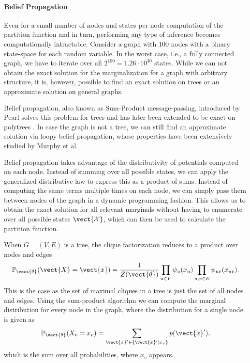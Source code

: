 \paragraph*{Belief Propagation}
Even for a small number of nodes and states per node computation of the partition function and in turn, performing any type of inference becomes computationally intractable.
Consider a graph with 100 nodes with a binary state-space for each random variable.
In the worst case, i.e., a fully connected graph, we have to iterate over all $2^{100} = 1.26\cdot 10^{30}$ states.
While we can not obtain the exact solution for the marginalization for a graph with arbitrary structure, it is, however, possible to find an exact solution on trees or an approximate solution on general graphs.


Belief propagation, also known as Sum-Product message-passing, introduced by Pearl \cite{pearl1982reverend} solves this problem for trees and has later been extended to be exact on polytrees \cite{kim1983computational}.
In case the graph is not a tree, we can still find an approximate solution via loopy belief propagation, whose properties have been extensively studied by Murphy et al. \cite{murphy2013loopy}.

Belief propagation takes advantage of the distributivity of potentials computed on each node.
Instead of summing over all possible states, we can apply the generalized distributive law to express this as a product of sums.
Instead of computing the same terms multiple times on each node, we can simply pass them between nodes of the graph in a dynamic programming fashion.
This allows us to obtain the exact solution for all relevant marginals without having to enumerate over all possible states $\vect{\mathcal{X}}$, which can then be used to calculate the partition function.

When $G=(V,E)$ is a tree, the clique factorization reduces to a product over nodes and edges
\begin{equation}
    \label{eq:edgepot}
    \mathbb{P}_{\vect{\theta}}(\vect{X} = \vect{x}) = \frac{1}{Z(\vect{\theta})} \prod_{u\in V} \psi_u(x_u) \prod_{u,v \in E} \psi_{uv}(x_{uv}).
\end{equation}
This is the case as the set of maximal cliques in a tree is just the set of all nodes and edges.
Using the sum-product algorithm we can compute the marginal distribution for every node in the graph, where the distribution for a single node is given as
\begin{equation}
    \mathbb{P}_{\vect{\theta}}(X_v = x_v) = \sum_{\vect{x}' \in \{\vect{x}' \lvert x_v\}} p(\vect{x}'),
\end{equation}
which is the sum over all probabilities, where $x_v$ appears.

